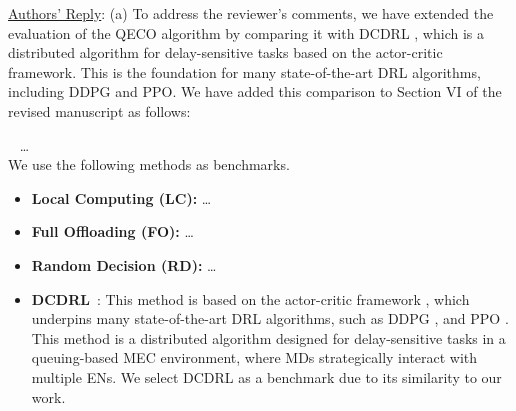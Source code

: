 \documentclass[12pt,draftclsnofoot,onecolumn]{IEEEtran}
\newcommand{\rev}[1]{{\color{blue}#1}} %
\newcommand{\rev}[1]{#1}
\newenvironment{my}[2]%
{\begin{list}{}%
{\setlength{\rightmargin}{#1}\setlength{\leftmargin}{#2}}%


 \item[]{}

} {\end{list}}
\begin{document}
\begin{enumerate}
\underline{Authors' Reply}: (a) To address the reviewer's comments, we have extended the evaluation of the QECO algorithm by comparing it with DCDRL \cite{qiu2020distributed}, which is a distributed algorithm for delay-sensitive tasks based on the actor-critic framework. This is the foundation for many state-of-the-art DRL algorithms, including DDPG and PPO. 
We have added this comparison to Section VI of the revised manuscript as follows: \newline 


		\begin{my}{1cm}{1cm}
	\rev{
		{\
			\color{black}
\hspace{-10mm}  \dots \\ We use the following methods as benchmarks.
\begin{itemize}
	
	\item \textbf{Local Computing (LC):} \dots\vspace{1mm}
	
	\item \textbf{Full Offloading (FO):} \dots\vspace{1mm}
	
	\item \textbf{Random Decision (RD):} \dots\vspace{1mm}
	
	\color{blue}
	\item \textbf{DCDRL}~\cite{qiu2020distributed}: This method is based on the actor-critic framework \cite{NIPS1999_6449f44a}, which underpins many state-of-the-art DRL algorithms, such as DDPG \cite{lillicrap2015continuous}, and PPO \cite{schulman2017proximal}. This method is a distributed algorithm designed for delay-sensitive tasks in a queuing-based MEC environment, where MDs strategically interact with multiple ENs. We select DCDRL as a benchmark due to its similarity to our work. 
	
	
	
\end{itemize}

}}
\end{my}\vspace{5mm}


\end{enumerate}
\end{document}
